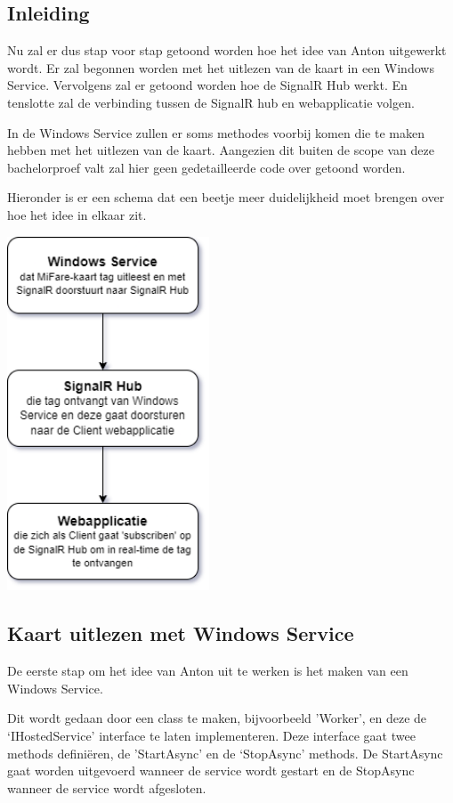 \subsection{Inleiding}
Nu zal er dus stap voor stap getoond worden hoe het idee van Anton uitgewerkt wordt. Er zal begonnen worden met het uitlezen van de kaart in een Windows Service. Vervolgens zal er getoond worden hoe de SignalR Hub werkt. En tenslotte zal de verbinding tussen de SignalR hub en webapplicatie volgen.   

In de Windows Service zullen er soms methodes voorbij komen die te maken hebben met het uitlezen van de kaart. Aangezien dit buiten de scope van deze bachelorproef valt zal hier geen gedetailleerde code over getoond worden. 

Hieronder is er een schema dat een beetje meer duidelijkheid moet brengen over hoe het idee in elkaar zit. 

\begin{center}
    \includegraphics[width=6cm]{BP_voorbeeld_schema}
\end{center}

\subsection{Kaart uitlezen met Windows Service}
De eerste stap om het idee van Anton uit te werken is het maken van een Windows Service.  

Dit wordt gedaan door een class te maken, bijvoorbeeld 'Worker’, en deze de ‘IHostedService’ interface te laten implementeren. Deze interface gaat twee methods definiëren, de 'StartAsync’ en de ‘StopAsync’ methods. De StartAsync gaat worden uitgevoerd wanneer de service wordt gestart en de StopAsync wanneer de service wordt afgesloten.  

